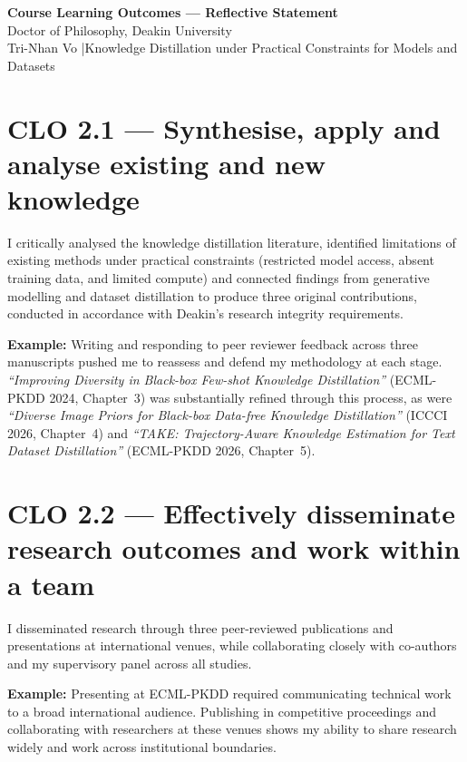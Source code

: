 \documentclass[11pt,a4paper]{book}
\begin{document}
\begin{center}
  {\bfseries Course Learning Outcomes --- Reflective Statement}\\[2pt]
  Doctor of Philosophy, Deakin University\\[1pt]
  {\small Tri-Nhan Vo \quad|\quad Knowledge Distillation under Practical Constraints for Models and Datasets}
\end{center}

\section{CLO 2.1 --- Synthesise, apply and analyse existing and new knowledge}
\begin{foldable}
  I critically analysed the knowledge distillation literature, identified limitations of existing methods under practical constraints (restricted model access, absent training data, and limited compute) and connected findings from generative modelling and dataset distillation to produce three original contributions, conducted in accordance with Deakin's research integrity requirements.
\end{foldable}

\begin{foldable}
  \textbf{Example:} Writing and responding to peer reviewer feedback across three manuscripts pushed me to reassess and defend my methodology at each stage. \textit{``Improving Diversity in Black-box Few-shot Knowledge Distillation''} (ECML-PKDD 2024, Chapter~3) was substantially refined through this process, as were \textit{``Diverse Image Priors for Black-box Data-free Knowledge Distillation''} (ICCCI 2026, Chapter~4) and \textit{``TAKE: Trajectory-Aware Knowledge Estimation for Text Dataset Distillation''} (ECML-PKDD 2026, Chapter~5).
\end{foldable}

\section{CLO 2.2 --- Effectively disseminate research outcomes and work within a team}
\begin{foldable}
  I disseminated research through three peer-reviewed publications and presentations at international venues, while collaborating closely with co-authors and my supervisory panel across all studies.
\end{foldable}

\begin{foldable}
  \textbf{Example:} Presenting at ECML-PKDD required communicating technical work to a broad international audience. Publishing in competitive proceedings and collaborating with researchers at these venues shows my ability to share research widely and work across institutional boundaries.
\end{foldable}
\end{document}
